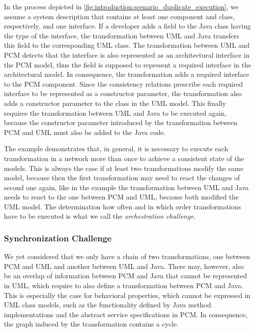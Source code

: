 In the process depicted in \autoref{fig:introduction:scenario_duplicate_execution}, we assume a system description that contains at least one component and class, respectively, and one interface.
If a developer adds a field to the Java class having the type of the interface, the transformation between \gls{UML} and Java transfers this field to the corresponding \gls{UML} class.
The transformation between \gls{UML} and \gls{PCM} detects that the interface is also represented as an architectural interface in the \gls{PCM} model, thus the field is supposed to represent a required interface in the architectural model.
In consequence, the transformation adds a required interface to the \gls{PCM} component.
Since the consistency relations prescribe each required interface to be represented as a constructor parameter, the transformation also adds a constructor parameter to the class in the \gls{UML} model.
This finally requires the transformation between \gls{UML} and Java to be executed again, because the constructor parameter introduced by the transformation between \gls{PCM} and \gls{UML} must also be added to the Java code.

The example demonstrates that, in general, it is necessary to execute each transformation in a network more than once to achieve a consistent state of the models.
This is always the case if at least two transformations modify the same model, because then the first transformation may need to react the changes of second one again, like in the example the transformation between \gls{UML} and Java needs to react to the one between \gls{PCM} and \gls{UML}, because both modified the \gls{UML} model.
The determination how often and in which order transformations have to be executed is what we call the \emph{orchestration challenge}.

\subsubsection*{Synchronization Challenge}
\label{chap:introduction:challenges:correctness:synchronization}
We yet considered that we only have a chain of two transformations, one between \gls{PCM} and \gls{UML} and another between \gls{UML} and Java.
There may, however, also be an overlap of information between \gls{PCM} and Java that cannot be represented in \gls{UML}, which require to also define a transformation between \gls{PCM} and Java.
This is especially the case for behavioral properties, which cannot be expressed in UML class models, such as the functionality defined by Java method implementations and the abstract service specifications in \gls{PCM}.
In consequence, the graph induced by the transformation contains a cycle.

